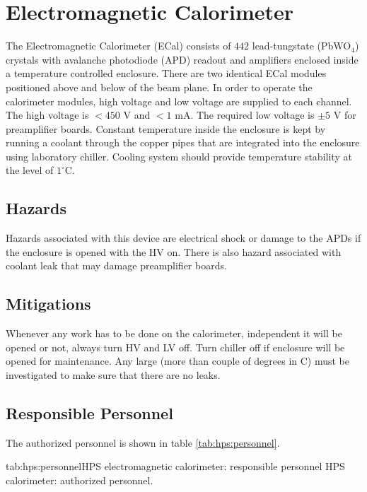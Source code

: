 \section{Electromagnetic Calorimeter}
\indent

The Electromagnetic Calorimeter (ECal) consists of $442$ lead-tungstate (PbWO$_4$) crystals with avalanche photodiode (APD) 
readout and amplifiers enclosed inside a temperature controlled enclosure. There are two identical ECal modules positioned above and below of the beam plane. In order to operate the calorimeter modules,  high voltage and low voltage are supplied to each channel. The high voltage is $<450$ V and $<1$ mA. The required low voltage is $\pm 5$ V for preamplifier boards. Constant temperature inside the enclosure is kept by running a coolant through the copper pipes that are integrated into the enclosure using laboratory chiller. Cooling system should provide temperature stability at the level of $1^\circ$C.

\subsection{Hazards} 
\indent

Hazards associated with this device are electrical shock or damage to the APDs if the enclosure is opened with the  HV on. There is also hazard associated with coolant leak that may damage preamplifier boards.

\subsection{Mitigations}
\indent

Whenever any work has to be done on the calorimeter, independent it will be opened or not, always turn HV and LV off. Turn chiller off if enclosure will be opened for maintenance. Any large (more than couple of degrees in C) must be investigated to make sure that there are no leaks.   



\begin{safetyen}{10}{15}
\subsection{Responsible  Personnel} 
\end{safetyen}
The authorized personnel is shown in table \ref{tab:hps:personnel}.
\begin{namestab}{tab:hps:personnel}{HPS  electromagnetic calorimeter: responsible personnel}{%
      HPS calorimeter: authorized personnel.}
\end{namestab}


